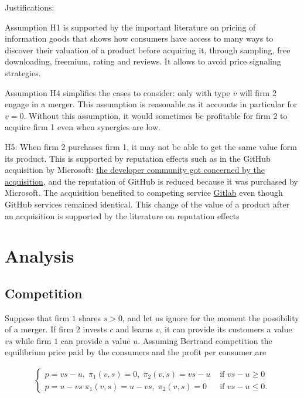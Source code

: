 \documentclass[a4paper,leqno]{article}%
\newcommand{\uv}{\underline{v}}
\newcommand{\ov}{\overline{v}}
\begin{document}
Justifications:

Assumption H1 is supported by the important literature on pricing of information goods \citep{shapiro1998information} that shows how consumers have access to many ways to discover their valuation of a product before acquiring it, through sampling, free downloading, freemium, rating and reviews. It allows to avoid price signaling strategies.

Assumption H4 simplifies the cases to consider: only with type $\ov$ will firm 2 engage in a merger. This assumption is reasonable as it accounts in particular for $\uv=0$. Without this assumption, it would sometimes be profitable for firm 2 to acquire firm 1 even when synergies are low.

H5: When firm 2 purchases firm 1, it may not be able to get the same value form its product. This is supported by reputation effects such as in the GitHub acquisition by Microsoft: \href{https://www.theverge.com/2018/10/26/17954714/microsoft-github-deal-acquisition-complete}{the developer community got concerned by the acquisition}, and the reputation of GitHub is reduced because it was purchased by Microsoft. The acquisition benefited to competing service \href{https://www.itprotoday.com/linux/why-open-source-software-moving-gitlab-after-microsoft-github-deal}{Gitlab} even though GitHub services remained identical.
This change of the value of a product after an acquisition is supported by the literature on reputation effects \citep{tadelis1999s}

\section{Analysis}

\subsection{Competition}


Suppose that firm $1$ shares $s>0$, and let us ignore for the moment the possibility of a merger. If firm $2$ invests $c$ and learns $v$, it can provide its customers a value $vs$ while firm $1$ can provide a value $u$. Assuming Bertrand competition the equilibrium price paid by the consumers and the profit per consumer are

\begin{align}\label{comp}
\begin{cases}
    p=vs-u,\; \pi_1(v,s)=0,\; \pi_2(v,s)=vs-u & \text{ if }vs-u\geq 0\\ 
    p=u-vs\; \pi_1(v,s)=u-vs,\; \pi_2(v,s)=0 & \text{ if }vs-u\leq 0.
\end{cases}
\end{align}
\end{document}
